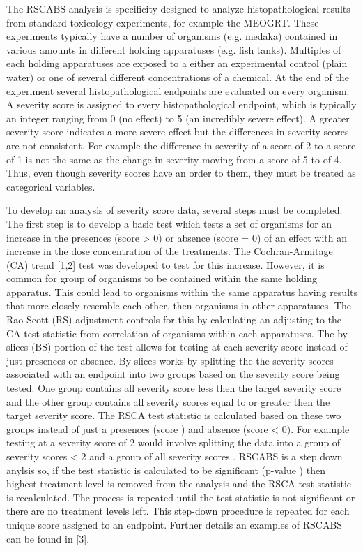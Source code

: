 \documentclass[a4paper]{article}
\begin{document}
\par
	The RSCABS analysis is specificity designed to analyze histopathological results from standard toxicology experiments, for example the MEOGRT. 
	These experiments typically have a number of organisms (e.g. medaka) contained in various amounts in different holding apparatuses (e.g. fish tanks).  
	Multiples of each holding apparatuses are exposed to a either an experimental control (plain water) or one of several different concentrations of a chemical.  
	At the end of the experiment several histopathological endpoints are evaluated on every organism.  
	A severity score is assigned to every histopathological endpoint, which is typically an integer ranging from 0 (no effect) to 5 (an incredibly severe effect).  
	A greater severity score indicates a more severe effect but the differences in severity scores are not consistent.   
	For example the difference in severity of a score of 2 to a score of 1 is not the same as the change in 
    severity moving from a score of 5 to of 4. 
	Thus, even though severity scores have an order to them, they must be treated as categorical variables.     
\par
	To develop an analysis of severity score data, several steps must be completed.  The first step is to develop a basic test which 
	tests a set of organisms 
	for an increase in the presences (score > 0) or absence (score = 0) of an effect with an increase in the dose concentration of the treatments. 
	The Cochran-Armitage (CA) trend [1,2]  test was developed to test for this increase.
	However, it is common for group of organisms to be contained within the same holding apparatus.  
	This could lead to organisms within the same apparatus having results that more closely resemble each other, then organisms in other apparatuses.  	
	The Rao-Scott (RS) adjustment controls for this by calculating an adjusting to the CA test statistic from correlation of organisms within each apparatuses. 
	The by slices (BS) portion of the test allows for testing at each severity score instead of just presences or absence.  By slices works by splitting the
	the severity scores associated with an endpoint into two groups based on the severity score being tested.  
	One group contains all severity score less then the target 
	severity score and the other group contains all severity scores equal to or greater then the target severity score. 	
	The RSCA test statistic is calculated based on these two groups instead of just a presences (score  \ge {}) and absence (score < 0). For example testing at a severity score of 2 
	would involve splitting the data into a group of severity scores < 2 
	and a group of all severity scores \ge {}. 
	RSCABS is a step down anylsis so, if the test statistic is calculated to be significant (p-value \ge {}) then highest treatment level is removed from the 
	analysis and the RSCA test statistic is recalculated. The process is repeated until the test statistic is not significant or there are no treatment levels left.  
	This step-down procedure is repeated for each unique score assigned to an endpoint. Further details an examples of RSCABS can be found in [3]. 	
	
\end{document}
